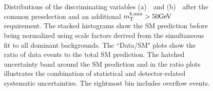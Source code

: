 \begin{figure}[t]
  \begin{center}
    \caption[Distributions of the discriminating variables \mantikttwelvezero\ and \mtbmin\ after common preselection.]{Distributions of the discriminating variables (a)~\mantikttwelvezero\ and (b)~\mtbmin\ after the common preselection and an additional $\mtbmin>50\gev$ requirement. The stacked histograms show the SM prediction before being normalized using scale factors derived from the simultaneous fit to all dominant backgrounds. The ``Data/SM" plots show the ratio of data events to the total SM prediction. The hatched uncertainty band around the SM prediction and in the ratio plots illustrates the combination of statistical and detector-related systematic uncertainties. The rightmost bin includes overflow events.}
    \label{fig:preselection}
  \end{center}
\end{figure}
\clearpage


